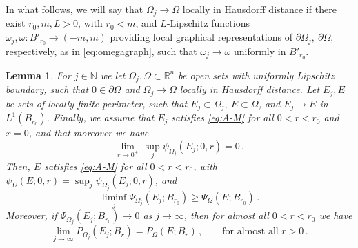 \documentclass[a4paper,reqno,11pt]{amsart}
\newtheorem{lemma}[theorem]{Lemma}
\newcommand{\N}{\mathbb{N}}
\newcommand{\R}{\mathbb{R}}
\newcommand{\ra}{\rightarrow}
\newcommand{\de}{\partial}
\newcommand{\pr}{P_{\Omega}}
\newcommand{\p}{P}
\begin{document}
In what follows, we will say that $\Omega_{j}\to \Omega$ locally in Hausdorff distance if there exist $r_{0},m,L>0$, with $r_{0}<m$, and $L$-Lipschitz functions $\omega_{j},\omega:B'_{r_{0}}\to (-m,m)$ providing local graphical representations of $\de \Omega_{j},\ \de\Omega$, respectively,  as in \eqref{eq:omegagraph}, such that $\omega_{j}\to \omega$ uniformly in $B'_{r_{0}}$. 
\begin{lemma}\label{lem:gaplsc}
For $j\in \N$ we let $\Omega_{j},\Omega\subset \R^{n}$ be open sets with uniformly Lipschitz boundary, such that $0\in \de\Omega$ and $\Omega_{j}\to \Omega$ locally in Hausdorff distance. Let $E_{j}, E$ be sets of locally finite perimeter, such that $E_{j}\subset \Omega_{j},\ E\subset \Omega$, and $E_{j}\to E$ in $L^{1}(B_{r_{0}})$. Finally, we assume that $E_{j}$ satisfies \eqref{eq:A-M} for all $0<r<r_{0}$ and $x=0$, and that moreover we have
\[
\lim_{r\to 0^{+}}\, \sup_{j} \psi_{\Omega_{j}}(E_{j};0,r) = 0\,.
\]
Then, $E$ satisfies \eqref{eq:A-M} for all $0<r<r_{0}$, with $\psi_{\Omega}(E;0,r) = \sup_{j} \psi_{\Omega_{j}}(E_{j};0,r)$, and 
\begin{equation}\label{LSCMinGap}
\liminf_{j} \Psi_{\Omega_{j}}(E_{j};B_{r_{0}}) \ge \Psi_{\Omega}(E;B_{r_{0}})\,.
\end{equation}
Moreover, if $\Psi_{\Omega_{j}}(E_{j};B_{r_{0}}) \to 0$ as $j\to\infty$, then for almost all $0<r<r_{0}$ we have
\begin{equation}\label{eq:perimcont}
\lim_{j \ra \infty} \p_{\Omega_{j}}(E_{j}; B_{r}) = \pr(E;B_{r}) \, , \qquad \text{for almost all $r > 0 \, .$}
\end{equation}
\end{lemma}
\end{document}
